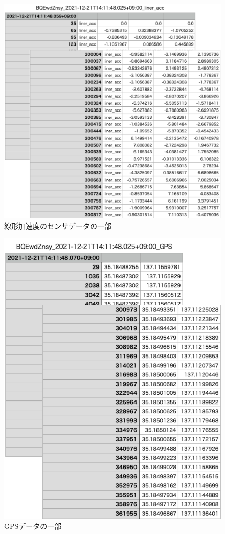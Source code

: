 \begin{figure}[tbh]
    \centering
    \includegraphics[width=16cm]{img_ex_case_1_acc.png}
    \caption{線形加速度のセンサデータの一部}
    \label{fig:ex_case_1_acc}
\end{figure}

\begin{figure}[tbh]
    \centering
    \includegraphics[width=16cm]{img_ex_case_1_gps.png}
    \caption{GPSデータの一部}
    \label{fig:ex_case_1_gps}
\end{figure}

